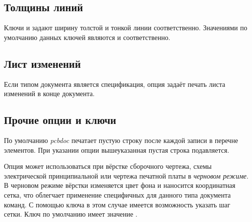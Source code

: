 \subsection{Толщины линий}

Ключи  и  задают ширину толстой и
тонкой линии соответственно. Значениями по умолчанию данных ключей являются
 и  соответственно.

\subsection{Лист изменений}

Если типом документа является спецификация, опция  задаёт
печать листа изменений в конце документа.

\subsection{Прочие опции и ключи}

По умолчанию \emph{pcbdoc} печатает пустую строку после каждой записи в перечне
элементов. При указании опции  вышеуказанная пустая строка
подавляется.

Опция  может использоваться при вёрстке сборочного чертежа, схемы
электрической принципиальной или чертежа печатной платы в \emph{черновом режиме}. В
черновом режиме вёрстки изменяется цвет фона и наносится координатная сетка, что
облегчает применение специфичных для данного типа документа команд. С помощью ключа
 в этом случае имеется возможность указать шаг сетки. Ключ
 по умолчанию имеет значение .

